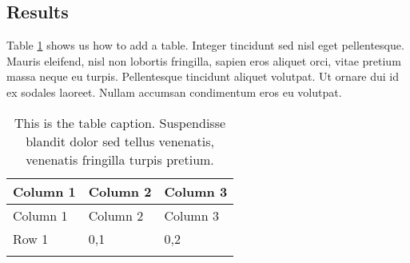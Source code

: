 \hypertarget{results-2}{%
\subsection{Results}\label{results-2}}

Table \ref{ref_a_table} shows us how to add a table. Integer
tincidunt sed nisl eget pellentesque. Mauris eleifend, nisl non
lobortis fringilla, sapien eros aliquet orci, vitae pretium massa
neque eu turpis. Pellentesque tincidunt aliquet volutpat. Ut ornare
dui id ex sodales laoreet. Nullam accumsan condimentum eros eu
volutpat.

\begin{longtable}[htbp]{@{}lll@{}}
\caption[This is a short table caption]{This is the table caption. Suspendisse blandit dolor sed tellus venenatis, venenatis fringilla turpis pretium. \label{ref_a_table}}\endlastfoot
\toprule
\begin{minipage}[b]{0.1388888888888889\columnwidth}\raggedright
Column 1\strut
\end{minipage} & \begin{minipage}[b]{0.16666666666666666\columnwidth}\raggedright
Column 2\strut
\end{minipage} & \begin{minipage}[b]{0.1388888888888889\columnwidth}\raggedright
Column 3\strut
\end{minipage}\tabularnewline
\midrule
\endfirsthead
\toprule
\begin{minipage}[b]{0.1388888888888889\columnwidth}\raggedright
Column 1\strut
\end{minipage} & \begin{minipage}[b]{0.16666666666666666\columnwidth}\raggedright
Column 2\strut
\end{minipage} & \begin{minipage}[b]{0.1388888888888889\columnwidth}\raggedright
Column 3\strut
\end{minipage}\tabularnewline
\midrule
\endhead
\begin{minipage}[t]{0.1388888888888889\columnwidth}\raggedright
Row 1\strut
\end{minipage} & \begin{minipage}[t]{0.16666666666666666\columnwidth}\raggedright
0,1\strut
\end{minipage} & \begin{minipage}[t]{0.1388888888888889\columnwidth}\raggedright
0,2\strut
\end{minipage}\tabularnewline\begin{minipage}[t]{0.1388888888888889\columnwidth}\raggedright

\end{minipage}
\end{longtable}
